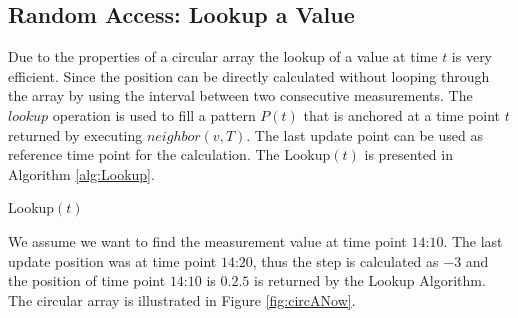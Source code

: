 \documentclass[abstracton,12pt]{scrreprt}
\begin{document}
\subsection{Random Access: Lookup a Value}
Due to the properties of a circular array the lookup of a value at time $t$ is very efficient. Since the position can be directly calculated without looping through the array by using the interval between two consecutive measurements. The $lookup$ operation is used to fill a pattern $P(t)$ that is anchored at a time point $t$ returned by executing $neighbor(v,T)$. The last update point can be used as reference time point for the calculation. The Lookup$(t)$ is presented in Algorithm \ref{alg:Lookup}.
\BlankLine
\begin{algorithm}[H]
	\IncMargin{1em}
	\SetAlgoLined
	\DontPrintSemicolon
	
	
	
	
	\caption{Lookup$(t)$}	
	\label{alg:Lookup}
\end{algorithm}


\begin{exmp}
	We assume we want to find the measurement value at time point $\text{14:10}$. The last update position was at time point $\text{14:20}$, thus the step is calculated as $-3$ and the position of time point $\text{14:10}$ is $0$.$2.5$ is returned by the Lookup Algorithm. The circular array is illustrated in Figure \ref{fig:circANow}.   
\end{exmp}
\end{document}
